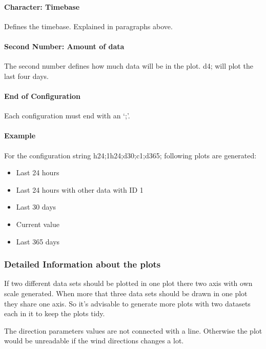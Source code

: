 \paragraph{Character: Timebase} %
\label{par:character}
Defines the timebase. Explained in paragraphs above.
\paragraph{Second Number: Amount of data} %
\label{par:number}
The second number defines how much data will be in the plot. d4; will plot the last four days.
\paragraph{End of Configuration} %
\label{par:end_of_configuration}
Each configuration must end with an {\C `;'}.

\paragraph{Example} %
\label{par:example}
For the configuration string {\C h24;1h24;d30;c1;d365;} following plots are generated:
\begin{itemize}
	\item Last 24 hours
	\item Last 24 hours with other data with ID 1 
	\item Last 30 days
	\item Current value
	\item Last 365 days
\end{itemize}


\subsubsection{Detailed Information about the plots} %
\label{ssub:detailed_information_about_the_plots}
If two different data sets should be plotted in one plot there two axis with own scale generated. When more that three data sets should be drawn in one plot they share one axis. So it's advisable to generate more plots with two datasets each in it to keep the plots tidy.

The direction parameters values are not connected with a line. Otherwise the plot would be unreadable if the wind directions changes a lot.

